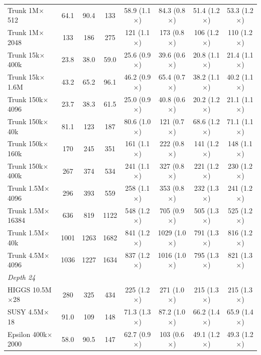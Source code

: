 \begin{table}[p]
\begin{tabular}{l|ccc|cccc}
        Trunk 1M$\times$512 & 64.1 & 90.4 & 133 & 58.9 (1.1$\times$) & 84.3 (0.8$\times$) & 51.4 (1.2$\times$) & 53.3 (1.2$\times$) \\
        Trunk 1M$\times$2048 & 133 & 186 & 275 & 121 (1.1$\times$) & 173 (0.8$\times$) & 106 (1.2$\times$) & 110 (1.2$\times$) \\
        Trunk 15k$\times$400k & 23.8 & 38.0 & 59.0 & 25.6 (0.9$\times$) & 39.6 (0.6$\times$) & 20.8 (1.1$\times$) & 21.4 (1.1$\times$) \\
        Trunk 15k$\times$1.6M & 43.2 & 65.2 & 96.1 & 46.2 (0.9$\times$) & 65.4 (0.7$\times$) & 38.2 (1.1$\times$) & 40.2 (1.1$\times$) \\
        Trunk 150k$\times$4096 & 23.7 & 38.3 & 61.5 & 25.0 (0.9$\times$) & 40.8 (0.6$\times$) & 20.2 (1.2$\times$) & 21.1 (1.1$\times$) \\
        Trunk 150k$\times$40k & 81.1 & 123 & 187 & 80.6 (1.0$\times$) & 121 (0.7$\times$) & 68.6 (1.2$\times$) & 71.1 (1.1$\times$) \\
        Trunk 150k$\times$160k & 170 & 245 & 351 & 161 (1.1$\times$) & 222 (0.8$\times$) & 141 (1.2$\times$) & 148 (1.1$\times$) \\
        Trunk 150k$\times$400k & 267 & 374 & 534 & 241 (1.1$\times$) & 327 (0.8$\times$) & 221 (1.2$\times$) & 230 (1.2$\times$) \\
        Trunk 1.5M$\times$4096 & 296 & 393 & 559 & 258 (1.1$\times$) & 353 (0.8$\times$) & 232 (1.3$\times$) & 241 (1.2$\times$) \\
        Trunk 1.5M$\times$16384 & 636 & 819 & 1122 & 548 (1.2$\times$) & 705 (0.9$\times$) & 505 (1.3$\times$) & 525 (1.2$\times$) \\
        Trunk 1.5M$\times$40k & 1001 & 1263 & 1682 & 841 (1.2$\times$) & 1029 (1.0$\times$) & 791 (1.3$\times$) & 816 (1.2$\times$) \\
        Trunk 4.5M$\times$4096 & 1036 & 1227 & 1634 & 837 (1.2$\times$) & 1016 (1.0$\times$) & 795 (1.3$\times$) & 821 (1.3$\times$) \\
        \hline
        \multicolumn{8}{l}{\textit{Depth 24}} \\
        HIGGS 10.5M$\times$28 & 280 & 325 & 434 & 225 (1.2$\times$) & 271 (1.0$\times$) & 215 (1.3$\times$) & 215 (1.3$\times$) \\
        SUSY 4.5M$\times$18 & 91.0 & 109 & 148 & 71.3 (1.3$\times$) & 87.2 (1.0$\times$) & 66.2 (1.4$\times$) & 65.9 (1.4$\times$) \\
        Epsilon 400k$\times$2000 & 58.0 & 90.5 & 147 & 62.7 (0.9$\times$) & 103 (0.6$\times$) & 49.1 (1.2$\times$) & 49.3 (1.2$\times$) \\

\end{tabular}
\end{table}
